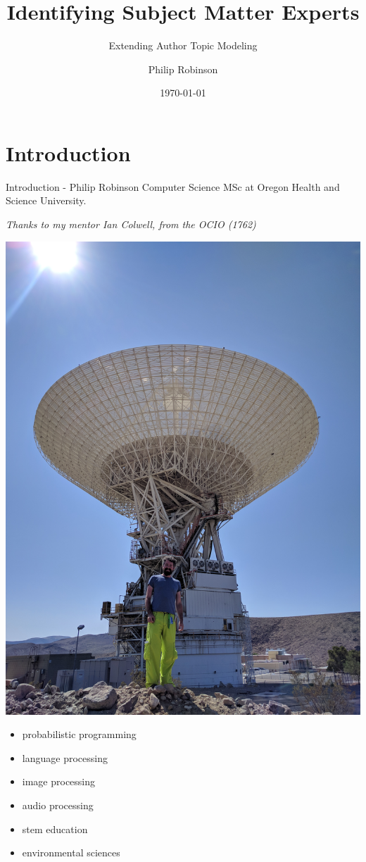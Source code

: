 \documentclass[10pt]{beamer}
\title{Identifying Subject Matter Experts}
\subtitle{Extending Author Topic Modeling}
\author{Philip Robinson}
\date{\today}
\institute{Presented to OCIO \\ NASA - Jet Propulsion Lab}
\begin{document}
\begin{frame}
  \titlepage


\end{frame}

\section{Introduction}
\begin{frame}{Introduction - Philip Robinson}
  Computer Science MSc at Oregon Health and Science University.

  \vspace{1em}

  {\em Thanks to my mentor Ian Colwell, from the OCIO (1762)}

  \begin{multicols}{2}
    \includegraphics[width=\columnwidth]{./philip.jpg}

    \begin{itemize}
    \item probabilistic programming
    \item language processing
    \item image processing
    \item audio processing
    \item stem education
    \item environmental sciences
    \end{itemize}

  \end{multicols}

\end{frame}
\end{document}
